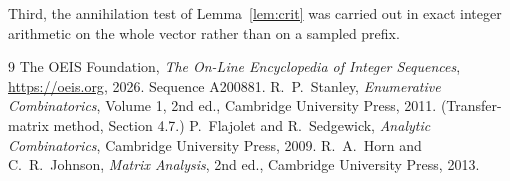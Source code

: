 \documentclass[11pt,a4paper]{article}
\theoremstyle{plain}
\theoremstyle{definition}
\begin{document}
Third, the annihilation test of Lemma~\ref{lem:crit} was carried out in exact integer
arithmetic on the whole vector rather than on a sampled prefix.

\begin{thebibliography}{9}
 The OEIS Foundation, \emph{The On-Line Encyclopedia of Integer
Sequences}, \url{https://oeis.org}, 2026. Sequence A200881.
 R.~P.~Stanley, \emph{Enumerative Combinatorics}, Volume 1, 2nd ed.,
Cambridge University Press, 2011. (Transfer-matrix method, Section 4.7.)
 P.~Flajolet and R.~Sedgewick, \emph{Analytic Combinatorics}, Cambridge
University Press, 2009.
 R.~A.~Horn and C.~R.~Johnson, \emph{Matrix Analysis}, 2nd ed., Cambridge
University Press, 2013.
\end{thebibliography}
\end{document}
